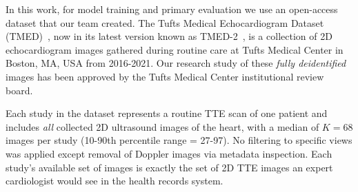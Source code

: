 

In this work, for model training and primary evaluation we use an open-access dataset 
that our team created.
The Tufts Medical Echocardiogram Dataset (TMED)~\citep{huang2021new},
now in its latest version known as TMED-2~\citep{huang2021new},  is a collection of 2D echocardiogram images gathered during routine care at Tufts Medical Center in Boston, MA, USA from 2016-2021. 
Our research study of these  \emph{fully deidentified} images has been approved by 
the Tufts Medical Center institutional review board.

Each study in the dataset represents a routine TTE scan of one patient and includes \emph{all} collected 2D ultrasound images of the heart, with a median of $K=68$ images per study (10-90th percentile range = 27-97). No filtering to specific views was applied except removal of Doppler images via metadata inspection. Each study's available set of images is exactly the set of 2D TTE images an expert cardiologist would see in the health records system.

